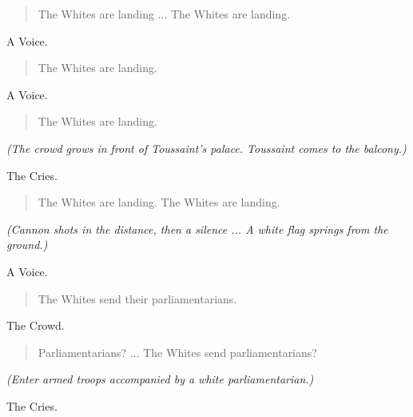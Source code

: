 \documentclass[letterpaper,article,12pt,oneside,notitlepage]{memoir}
\begin{document}
\begin{verse}
The Whites are landing ... The Whites are landing. \\
\end{verse}

\begin{center}A Voice.\end{center}

\begin{verse}
The Whites are landing. \\
\end{verse}

\begin{center}A Voice.\end{center}

\begin{verse}
The Whites are landing. \\
\end{verse}

\textit{(The crowd grows in front of Toussaint's palace. Toussaint comes to the balcony.)}

\begin{center}The Cries.\end{center}

\begin{verse}
The Whites are landing. The Whites are landing. \\
\end{verse}

\textit{(Cannon shots in the distance, then a silence ... A white flag springs from the ground.)}

\begin{center}A Voice.\end{center}

\begin{verse}
The Whites send their parliamentarians. \\
\end{verse}

\begin{center}The Crowd.\end{center}

\begin{verse}
Parliamentarians? ... The Whites send parliamentarians? \\
\end{verse}

\textit{(Enter armed troops accompanied by a white parliamentarian.)}

\begin{center}The Cries.\end{center}
\end{document}
